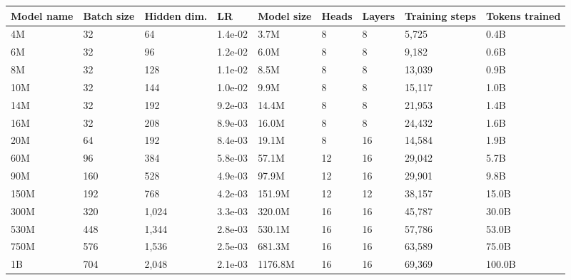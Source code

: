 \begin{tabular}{p{1cm}p{1cm}p{1cm}p{1.25cm}p{1cm}p{1cm}p{1cm}p{1cm}p{1cm}}
\toprule
Model name & Batch size & Hidden dim. & LR & Model size & Heads & Layers & Training steps & Tokens trained \\
\midrule
4M & 32 & 64 & 1.4e-02 & 3.7M & 8 & 8 & 5,725 & 0.4B \\
6M & 32 & 96 & 1.2e-02 & 6.0M & 8 & 8 & 9,182 & 0.6B \\
8M & 32 & 128 & 1.1e-02 & 8.5M & 8 & 8 & 13,039 & 0.9B \\
10M & 32 & 144 & 1.0e-02 & 9.9M & 8 & 8 & 15,117 & 1.0B \\
14M & 32 & 192 & 9.2e-03 & 14.4M & 8 & 8 & 21,953 & 1.4B \\
16M & 32 & 208 & 8.9e-03 & 16.0M & 8 & 8 & 24,432 & 1.6B \\
20M & 64 & 192 & 8.4e-03 & 19.1M & 8 & 16 & 14,584 & 1.9B \\
60M & 96 & 384 & 5.8e-03 & 57.1M & 12 & 16 & 29,042 & 5.7B \\
90M & 160 & 528 & 4.9e-03 & 97.9M & 12 & 16 & 29,901 & 9.8B \\
150M & 192 & 768 & 4.2e-03 & 151.9M & 12 & 12 & 38,157 & 15.0B \\
300M & 320 & 1,024 & 3.3e-03 & 320.0M & 16 & 16 & 45,787 & 30.0B \\
530M & 448 & 1,344 & 2.8e-03 & 530.1M & 16 & 16 & 57,786 & 53.0B \\
750M & 576 & 1,536 & 2.5e-03 & 681.3M & 16 & 16 & 63,589 & 75.0B \\
1B & 704 & 2,048 & 2.1e-03 & 1176.8M & 16 & 16 & 69,369 & 100.0B \\
\bottomrule
\end{tabular}